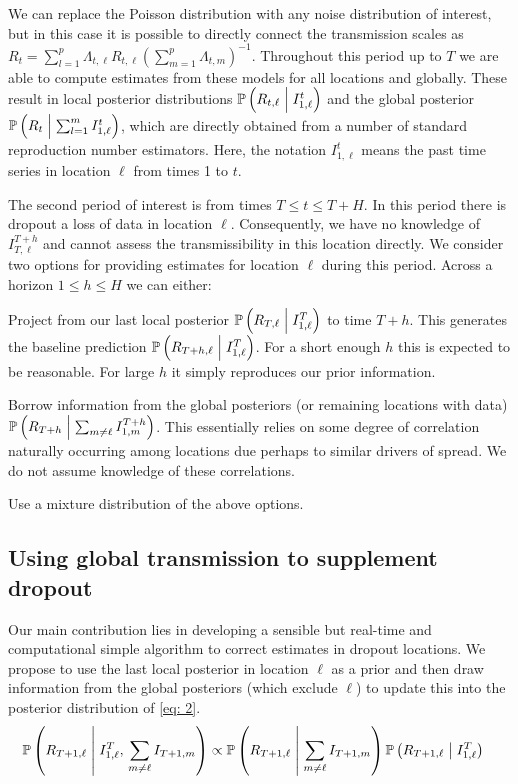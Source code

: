 \documentclass[12pt]{article}
\newcommand{\cond}{\; \m| \;}
\begin{document}
We can replace the Poisson distribution with any noise distribution of interest,
but in this case it is possible to directly connect the transmission scales as
$R_t = \sum_{l=1}^p \Lambda_{t, \ell}R_{t, \ell}\left(\sum_{m=1}^p \Lambda_{t,
m}\right)^{-1}$. Throughout this period up to $T$ we are able to compute
estimates from these models for all locations and globally. These result in
local posterior distributions $\mathbb{P}\left(R_{t, \ell} \cond I_{1,
\ell}^{t}\right)$ and the global posterior $\mathbb{P}\left(R_{t} \cond
\sum_{l=1}^m I_{1, \ell}^{t}\right)$, which are directly obtained from a number
of standard reproduction number estimators. Here, the notation $I_{1, \ell}^{t}$
means the past time series in location $\ell$ from times 1 to $t$.

The second period of interest is from times $T \leq t \leq T+H$. In this period
there is dropout \ie a loss of data in location $\ell$. Consequently, we have no
knowledge of $I_{T, \ell}^{T+h}$ and cannot assess the transmissibility in this
location directly. We consider two options for providing estimates for location
$\ell$ during this period. Across a horizon $1 \leq h \leq H$ we can either:
\benum
\item Project from our last local posterior $\mathbb{P}\left(R_{T, \ell}  \cond
I_{1, \ell}^{T}\right)$ to time $T+h$. This generates the baseline prediction
$\mathbb{P}\left(R_{T+h, \ell}  \cond I_{1, \ell}^{T}\right)$. For a short
enough $h$ this is expected to be reasonable. For large $h$ it simply reproduces
our prior information.
\item Borrow information from the global posteriors (or remaining locations with
data) $\mathbb{P}\left(R_{T+h}  \cond \sum_{m \neq \ell} I_{1, m}^{T+h}\right)$.
This essentially relies on some degree of correlation naturally occurring among
locations due perhaps to similar drivers of spread. We do not assume knowledge
of these correlations.
\item Use a mixture distribution of the above options.
\eenum

\subsection*{Using global transmission to supplement dropout}\label{sec:bayes}

Our main contribution lies in developing a sensible but real-time and
computational simple algorithm to correct estimates in dropout locations. We
propose to use the last local posterior in location $\ell$ as a prior and then
draw information from the global posteriors (which exclude $\ell$) to update
this into the posterior distribution of \eqref{eq: 2}.
\begin{align}
& \mathbb{P}\left(R_{T+1, \ell} \cond I_{1, \ell}^T, \, \sum_{m \neq \ell} 
I_{T+1, m} \right) 
\propto \mathbb{P}\left(R_{T+1, \ell}  \cond \sum_{m \neq \ell}
 I_{T+1, m}\right)\mathbb{P}\left(R_{T+1, \ell}  \cond I_{1, \ell}^{T}\right)
 \label{eq: 2}
\end{align}
\end{document}
